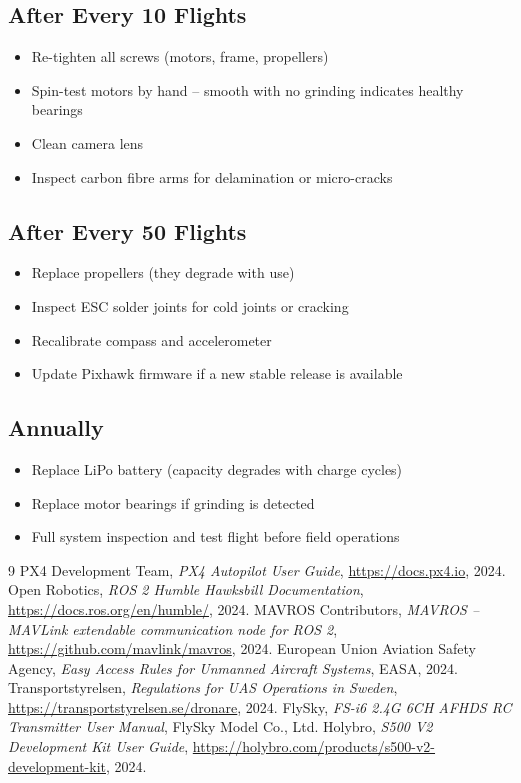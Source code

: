 \documentclass{article}
\begin{document}
\subsection*{After Every 10 Flights}
\begin{itemize}
    \item Re-tighten all screws (motors, frame, propellers)
    \item Spin-test motors by hand -- smooth with no grinding indicates healthy bearings
    \item Clean camera lens
    \item Inspect carbon fibre arms for delamination or micro-cracks
\end{itemize}

\subsection*{After Every 50 Flights}
\begin{itemize}
    \item Replace propellers (they degrade with use)
    \item Inspect ESC solder joints for cold joints or cracking
    \item Recalibrate compass and accelerometer
    \item Update Pixhawk firmware if a new stable release is available
\end{itemize}

\subsection*{Annually}
\begin{itemize}
    \item Replace LiPo battery (capacity degrades with charge cycles)
    \item Replace motor bearings if grinding is detected
    \item Full system inspection and test flight before field operations
\end{itemize}


\begin{thebibliography}{9}
    PX4 Development Team,
    \emph{PX4 Autopilot User Guide},
    \url{https://docs.px4.io}, 2024.
    Open Robotics,
    \emph{ROS 2 Humble Hawksbill Documentation},
    \url{https://docs.ros.org/en/humble/}, 2024.
    MAVROS Contributors,
    \emph{MAVROS -- MAVLink extendable communication node for ROS 2},
    \url{https://github.com/mavlink/mavros}, 2024.
    European Union Aviation Safety Agency,
    \emph{Easy Access Rules for Unmanned Aircraft Systems},
    EASA, 2024.
    Transportstyrelsen,
    \emph{Regulations for UAS Operations in Sweden},
    \url{https://transportstyrelsen.se/dronare}, 2024.
    FlySky,
    \emph{FS-i6 2.4G 6CH AFHDS RC Transmitter User Manual},
    FlySky Model Co., Ltd.
    Holybro,
    \emph{S500 V2 Development Kit User Guide},
    \url{https://holybro.com/products/s500-v2-development-kit}, 2024.
\end{thebibliography}
\end{document}
